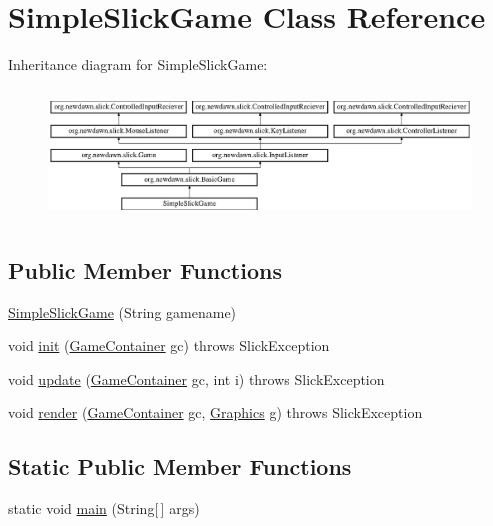 \hypertarget{class_simple_slick_game}{}\section{Simple\+Slick\+Game Class Reference}
\label{class_simple_slick_game}
Inheritance diagram for Simple\+Slick\+Game\+:\begin{figure}[H]
\begin{center}
\leavevmode
\includegraphics[height=3.522012cm]{class_simple_slick_game}
\end{center}
\end{figure}
\subsection*{Public Member Functions}
\begin{DoxyCompactItemize}
\item 
\mbox{\hyperlink{class_simple_slick_game_a4e58074dc344280962a5db792e242612}{Simple\+Slick\+Game}} (String gamename)
\item 
void \mbox{\hyperlink{class_simple_slick_game_a2380b54e7768fd10b9959866dffc57ce}{init}} (\mbox{\hyperlink{classorg_1_1newdawn_1_1slick_1_1_game_container}{Game\+Container}} gc)  throws Slick\+Exception 
\item 
void \mbox{\hyperlink{class_simple_slick_game_aea7cb63494fc122b2de53f909910a2cd}{update}} (\mbox{\hyperlink{classorg_1_1newdawn_1_1slick_1_1_game_container}{Game\+Container}} gc, int i)  throws Slick\+Exception 
\item 
void \mbox{\hyperlink{class_simple_slick_game_a7c65120173cde5294f3c4b7aa733b00a}{render}} (\mbox{\hyperlink{classorg_1_1newdawn_1_1slick_1_1_game_container}{Game\+Container}} gc, \mbox{\hyperlink{classorg_1_1newdawn_1_1slick_1_1_graphics}{Graphics}} g)  throws Slick\+Exception 	
\end{DoxyCompactItemize}
\subsection*{Static Public Member Functions}
\begin{DoxyCompactItemize}
\item 
static void \mbox{\hyperlink{class_simple_slick_game_a8d7c9dfdb647da562993ab6deb8c562d}{main}} (String\mbox{[}$\,$\mbox{]} args)
\end{DoxyCompactItemize}
